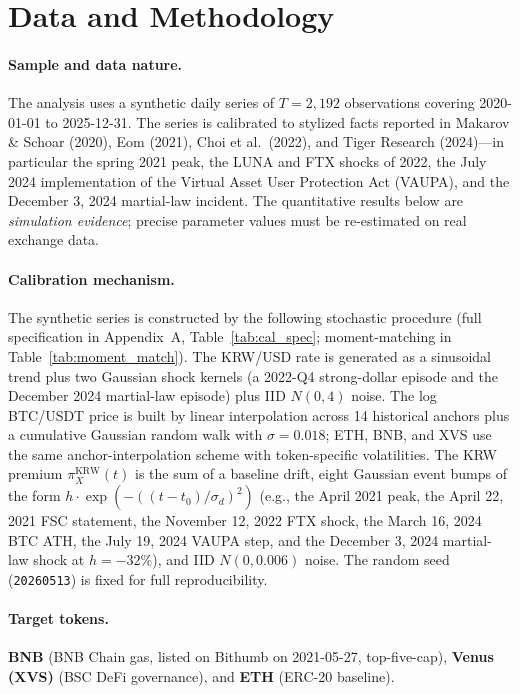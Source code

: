 \documentclass[11pt,a4paper]{article}
\begin{document}
\section{Data and Methodology}

\paragraph{Sample and data nature.}
The analysis uses a synthetic daily series of $T=2{,}192$ observations covering 2020-01-01 to 2025-12-31.
The series is calibrated to stylized facts reported in Makarov \& Schoar (2020), Eom (2021),
Choi et al.\ (2022), and Tiger Research (2024)---in particular the spring 2021 peak, the LUNA and FTX
shocks of 2022, the July 2024 implementation of the Virtual Asset User Protection Act (VAUPA), and
the December 3, 2024 martial-law incident. The quantitative results below are \emph{simulation
evidence}; precise parameter values must be re-estimated on real exchange data.

\paragraph{Calibration mechanism.}
The synthetic series is constructed by the following stochastic procedure (full specification in
Appendix~A, Table~\ref{tab:cal_spec}; moment-matching in Table~\ref{tab:moment_match}).
The KRW/USD rate is generated as a sinusoidal trend plus two Gaussian shock kernels (a 2022-Q4
strong-dollar episode and the December 2024 martial-law episode) plus IID $N(0,4)$ noise.
The log BTC/USDT price is built by linear interpolation across 14 historical anchors plus a cumulative
Gaussian random walk with $\sigma=0.018$; ETH, BNB, and XVS use the same anchor-interpolation scheme
with token-specific volatilities. The KRW premium $\pi^{\text{KRW}}_X(t)$ is the sum of a baseline
drift, eight Gaussian event bumps of the form $h\cdot\exp(-((t-t_0)/\sigma_d)^2)$ (e.g., the April 2021
peak, the April 22, 2021 FSC statement, the November 12, 2022 FTX shock, the March 16, 2024 BTC ATH,
the July 19, 2024 VAUPA step, and the December 3, 2024 martial-law shock at $h=-32\%$), and IID
$N(0,0.006)$ noise. The random seed (\texttt{20260513}) is fixed for full reproducibility.

\paragraph{Target tokens.}
\textbf{BNB} (BNB Chain gas, listed on Bithumb on 2021-05-27, top-five-cap), \textbf{Venus (XVS)}
(BSC DeFi governance), and \textbf{ETH} (ERC-20 baseline).
\end{document}
